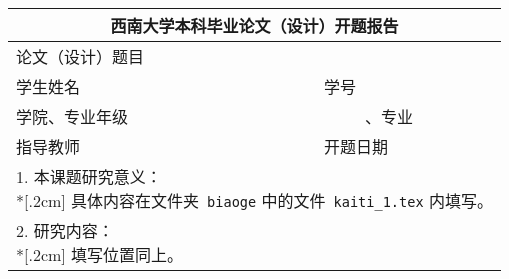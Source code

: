\pagestyle{empty}
\section*{}\label{table:kaiti_1}
{
	\begin{tabular}{|p{3cm}|p{5.1cm}|p{1.5cm}|p{4cm}|}
		\multicolumn{4}{c}{\zihao{-2}\textbf{西南大学本科毕业论文（设计）开题报告}}\\\hline
		\hspace*{\fill}论文（设计）题目\hspace*{\fill}     & \multicolumn{3}{c|}{\biaoti\cobiaoti}                                                                                                       \\\hline
		\hspace*{\fill}学生姓名\hspace*{\fill}     & \hspace*{\fill}\minzi\hspace*{\fill}             & \hspace*{\fill}学号\hspace*{\fill} & \hspace*{\fill}\xuehao\hspace*{\fill}              \\\hline
		学院、专业年级                             & \multicolumn{3}{c|}{\school、\zhuanye 专业~\nianji}                                                                                \\\hline
		\hspace*{\fill}指导教师\hspace*{\fill} & {\hspace*{\fill}\jiaoshi\hspace*{\fill}} & 开题日期                           & {\hspace*{\fill}\kaitiriqi\hspace*{\fill}} \\\hline
		\multicolumn{4}{|l|}{
			\parbox[t][9.2cm][s]{14.2cm}{
				1. 本课题研究意义：\\*[.2cm]
				具体内容在文件夹~{\tt biaoge} 中的文件~{\tt kaiti\_1.tex} 内填写。
		}} \\\hline
		\multicolumn{4}{|l|}{
			\parbox[t][9.2cm][t]{14.2cm}{
				2. 研究内容：\\*[.2cm]
				填写位置同上。
		}} \\\hline
\end{tabular}}
